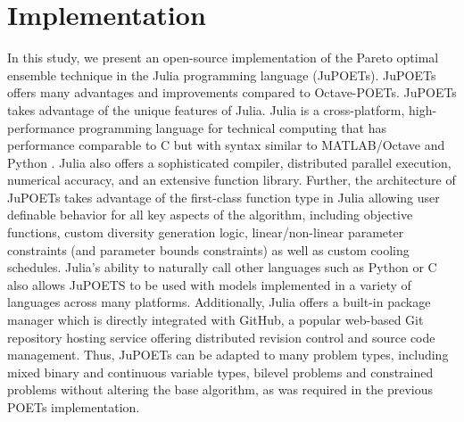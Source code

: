 \documentclass{bmcart}
\begin{document}
\section*{Implementation}
In this study, we present an open-source implementation of the Pareto optimal ensemble technique in the Julia programming language (JuPOETs).
JuPOETs offers many advantages and improvements compared to Octave-POETs.
JuPOETs takes advantage of the unique features of Julia.
Julia is a cross-platform, high-performance programming language for technical computing that has performance comparable to C but with syntax similar to MATLAB/Octave and Python \cite{Julia}. Julia also offers a sophisticated compiler, distributed parallel execution, numerical accuracy, and an extensive function library.
Further, the architecture of JuPOETs takes advantage of the first-class function type in Julia allowing user definable behavior for all key aspects of the algorithm, including objective functions, custom diversity generation logic, linear/non-linear parameter constraints (and parameter bounds constraints) as well as custom cooling schedules.
Julia's ability to naturally call other languages such as Python or C also allows JuPOETS to be used with models implemented in a variety of languages across many platforms.
Additionally, Julia offers a built-in package manager which is directly integrated with GitHub,
a popular web-based Git repository hosting service offering distributed revision control and source code management.
Thus, JuPOETs can be adapted to many problem types, including mixed binary and continuous variable types, bilevel problems and constrained problems without altering the base algorithm, as was required in the previous POETs implementation.
\end{document}
